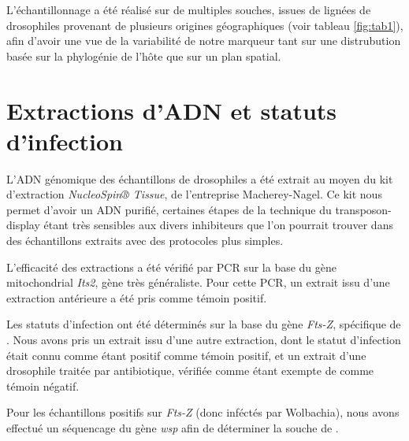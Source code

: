 	L’échantillonnage a été réalisé sur de multiples souches, issues de lignées de drosophiles provenant de plusieurs origines géographiques (voir tableau \ref{fig:tab1}), afin d’avoir une vue de la variabilité de notre marqueur tant sur une distrubution basée sur la phylogénie de l’hôte que sur un plan spatial.



\section{Extractions d'ADN et statuts d'infection} %
L’ADN génomique des échantillons de drosophiles a été extrait au moyen du kit d’extraction \textit{NucleoSpin® Tissue}, de l’entreprise Macherey-Nagel.
Ce kit nous permet d’avoir un ADN purifié, certaines étapes de la technique du transposon-display étant très sensibles aux divers inhibiteurs que l’on pourrait trouver dans des échantillons extraits avec des protocoles plus simples.

L’efficacité des extractions a été vérifié par PCR sur la base du gène mitochondrial \textit{Its2}, gène très généraliste. Pour cette PCR, un extrait issu d’une extraction antérieure a été pris comme témoin positif.

Les statuts d’infection ont été déterminés sur la base du gène \textit{Fts-Z}, spécifique de . Nous avons pris un extrait issu d’une autre extraction, dont le statut d’infection était connu comme étant positif comme témoin positif, et un extrait d’une drosophile traitée par antibiotique, vérifiée comme étant exempte de  comme témoin négatif.

Pour les échantillons positifs sur \textit{Fts-Z} (donc inféctés par Wolbachia), nous avons effectué un séquencage du gène \textit{wsp} afin de déterminer la souche de .

